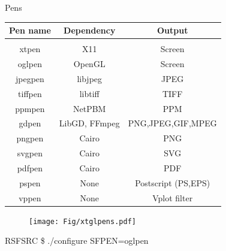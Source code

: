 \begin{frame}
  \begin{block}{Pens}
  \begin{table}
    \begin{center}
     \begin{tabular}{|c|c|c|}
      \hline    Pen name   &  Dependency   &    Output          \\
      \hline & & \\[-1em]
      \hline     xtpen     &     X11       &     Screen         \\
      \hline     oglpen    &   OpenGL      &     Screen         \\
      \hline     jpegpen   &   libjpeg     &     JPEG           \\
      \hline     tiffpen   &   libtiff     &     TIFF           \\
      \hline     ppmpen    &   NetPBM      &     PPM            \\
      \hline     gdpen     & LibGD, FFmpeg &  PNG,JPEG,GIF,MPEG \\
      \hline     pngpen    &   Cairo       &      PNG           \\
      \hline     svgpen    &   Cairo       &      SVG           \\
      \hline     pdfpen    &   Cairo       &      PDF           \\
      \hline     pspen     &    None       &   Postscript (PS,EPS)      \\
      \hline     vppen     &    None       &   Vplot filter     \\
      \hline
    \end{tabular}
   \end{center}
  \end{table}
  \end{block}
\end{frame}

\begin{frame}
  \begin{figure}
  \texttt{[image: Fig/xtglpens.pdf]}
  \end{figure}
  \begin{block}{}
   RSFSRC \$ ./configure SFPEN=oglpen
  \end{block}
\end{frame}

